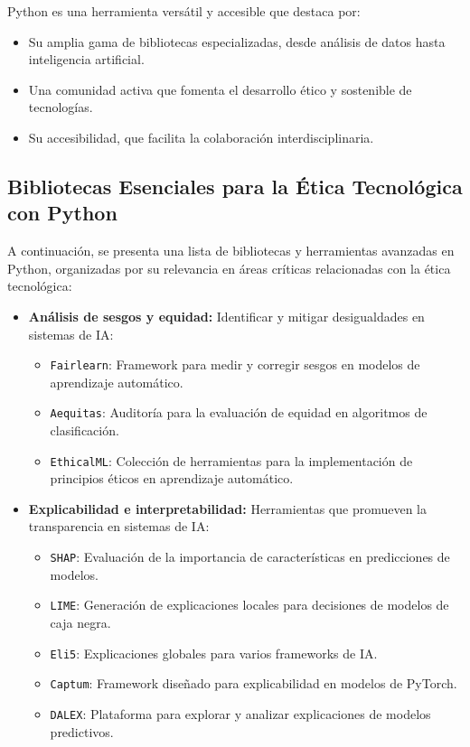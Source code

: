 \begin{refsection}
Python es una herramienta versátil y accesible que destaca por:

\begin{itemize}
    \item Su amplia gama de bibliotecas especializadas, desde análisis de datos hasta inteligencia artificial.
    \item Una comunidad activa que fomenta el desarrollo ético y sostenible de tecnologías.
    \item Su accesibilidad, que facilita la colaboración interdisciplinaria.
\end{itemize}



\subsection{Bibliotecas Esenciales para la Ética Tecnológica con Python}

A continuación, se presenta una lista de bibliotecas y herramientas avanzadas en Python, organizadas por su relevancia en áreas críticas relacionadas con la ética tecnológica:

\begin{itemize}
    \item \textbf{Análisis de sesgos y equidad:}  
    Identificar y mitigar desigualdades en sistemas de IA:
    \begin{itemize}
        \item \texttt{Fairlearn}: Framework para medir y corregir sesgos en modelos de aprendizaje automático.
        \item \texttt{Aequitas}: Auditoría para la evaluación de equidad en algoritmos de clasificación.
        \item \texttt{EthicalML}: Colección de herramientas para la implementación de principios éticos en aprendizaje automático.
    \end{itemize}

    \item \textbf{Explicabilidad e interpretabilidad:}  
    Herramientas que promueven la transparencia en sistemas de IA:
    \begin{itemize}
        \item \texttt{SHAP}: Evaluación de la importancia de características en predicciones de modelos.
        \item \texttt{LIME}: Generación de explicaciones locales para decisiones de modelos de caja negra.
        \item \texttt{Eli5}: Explicaciones globales para varios frameworks de IA.
        \item \texttt{Captum}: Framework diseñado para explicabilidad en modelos de PyTorch.
        \item \texttt{DALEX}: Plataforma para explorar y analizar explicaciones de modelos predictivos.
    \end{itemize}


\end{itemize}
\end{refsection}
